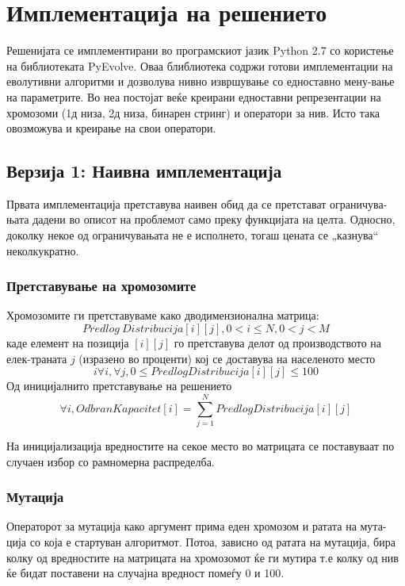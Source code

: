 \documentclass{article}
\begin{document}
\section{Имплементација на решението}

Решенијата се имплементирани во програмскиот јазик Python 2.7 со користење на библиотеката PyEvolve. Оваа блиблиотека содржи готови имплементации на еволутивни алгоритми и дозволува нивно извршување со едноставно мену-вање на параметрите. Во неа постојат веќе креирани едноставни репрезентации на хромозоми (1д низа, 2д низа, бинарен стринг) и оператори за нив. Исто така овозможува и креирање на свои оператори.

\subsection{Верзија 1: Наивна имплементација}

Првата имплементација претставува наивен обид да се претстават ограничува-њата дадени во описот на проблемот само преку функцијата на целта. Односно, доколку некое од ограничувањата не е исполнето, тогаш цената се „казнува“ неколкукратно. 

\subsubsection{Претставување на хромозомите}

Хромозомите ги претставуваме како дводимензионална матрица: 
\[Predlog\ Distribucija[i][j], 0 < i \leq N, 0 < j < M \]
каде елемент на позиција $[i][j]$ го претставува делот од производството на елек-траната $j$ (изразено во проценти) кој се доставува на населеното место 
\[i \forall i, \forall j, 0 \leq PredlogDistribucija[i][j] \leq 100\] Од иницијалнито претставување на решението 
\[ \forall i, OdbranKapacitet[i] = \sum_{j=1}^{N} PredlogDistribucija[i][j]\]

На иницијализација вредностите на секое место во матрицата се поставуваат по случаен избор со рамномерна распределба.

\subsubsection{Мутација}

Операторот за мутација како аргумент прима еден хромозом и ратата на мута-ција со која е стартуван алгоритмот. Потоа, зависно од ратата на мутација, бира колку од вредностите на матрицата на хромозомот ќе ги мутира т.е колку од нив ќе бидат поставени на случајна вредност помеѓу 0 и 100.
 
\end{document}
